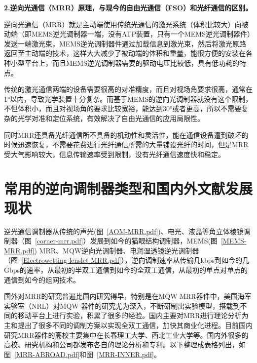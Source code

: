 \textbf{2.逆向光通信（MRR）原理，与现今的自由光通信（FSO）和光纤通信的区别。}


逆向光通信（MRR）就是主动端使用传统光通信的激光系统（体积比较大）向被动端（即MEMS逆光调制器一端，没有ATP装置，只有一个MEMS逆光调制器件）发送一端激光束，MEMS逆光调制器件通过加载信息到激光束，然后将激光原路返回至主动端的技术，这样大大减少了被动端的体积和重量，能很方便的安装在各种小型平台上，而且MEMS逆光调制器需要的驱动电压比较低，具有低功耗的特点。

传统的激光通信两端的设备需要很高的对准精度，而且对视场角要求很高，通常在1°以内，导致光学装置十分复杂。而基于MEMS的逆向光调制器就没有这个限制，不但体积小，而且对视场角的要求比较宽裕，能达到30°或者更高，所以不需要复杂的光学对准和定位系统，有效解决了自由光通信的应用局限性。

同时MRR还具备光纤通信所不具备的机动性和灵活性，能在通信设备遭到破坏的时候迅速恢复，不需要花费进行光纤通信所需的大量铺设光纤的时间，但是MRR受大气影响较大\cite{WYJ.2015.12}，信息传输速率受到限制，没有光纤通信速度快和稳定。





\section{常用的逆向调制器类型和国内外文献发展现状}
逆光通信调制器\citep{李展.2007, 孙华燕.2013, 邱灏.2015b}从传统的声光(图~\ref{AOM-MRR.pdf})、电光、液晶等角立体棱镜调制器（图~\ref{corner-mrr.pdf}）发展到如今的猫眼结构\citep{李展., 魏宾.b,任建迎.2017}调制器，MEMS(图~\ref{MEMS-MRR.pdf}) MRR、MQW逆向光调制器、电润湿透镜逆光调制器（图~\ref{Electrowetting-lenslet-MRR.pdf}），逆向调制速率从传输几kbps到如今的几Gbps的速率，从最初的半双工通信到如今的全双工通信，从最初的单点对单点的通信到如今的组网技术。

国外对MRR的研究普遍比国内研究得早，特别是在MQW MRR器件中，美国海军实验室（NRL）对MQW 器件的研究尤为深入，不断研制出实验模型，搭载到不同的移动平台上进行实验，积累了很多的经验。国内主要对MRR进行理论分析为主和提出了很多不同的调制方案以实现全双工通信，加快其商业化进程。目前国内研究MRR器件的高校主要集中在长春理工大学、西北工业大学等。国内外很多的高校、研究机构和公司都发布各自的理论分析和专利。以下整理成表格列出\citep{曾智龙.2017}，如图~\ref{MRR-ABROAD.pdf}和图~\ref{MRR-INNER.pdf}。


